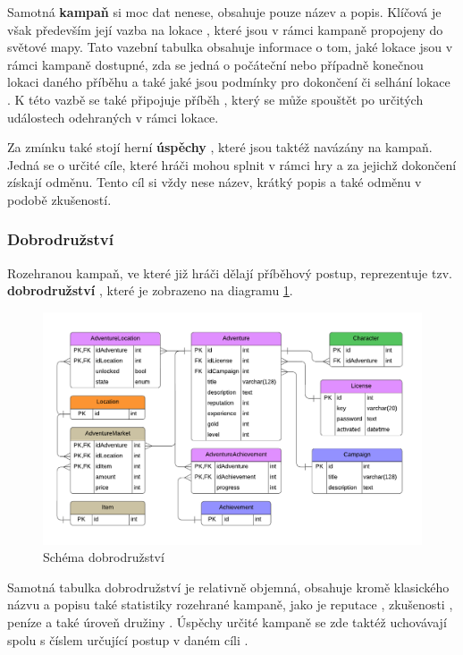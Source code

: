 Samotná \textbf{kampaň} si moc dat nenese, obsahuje pouze název a popis. Klíčová je však především její vazba na lokace , které jsou v rámci kampaně propojeny do světové mapy. Tato vazební tabulka obsahuje informace o tom, jaké lokace jsou v rámci kampaně dostupné, zda se jedná o počáteční  nebo případně konečnou  lokaci daného příběhu a také jaké jsou podmínky pro dokončení či selhání lokace . K této vazbě se také připojuje příběh , který se může spouštět po určitých událostech odehraných v rámci lokace.

Za zmínku také stojí herní \textbf{úspěchy} , které jsou taktéž navázány na kampaň. Jedná se o určité cíle, které hráči mohou splnit v rámci hry a za jejichž dokončení získají odměnu. Tento cíl si vždy nese název, krátký popis a také odměnu v podobě zkušeností.


\subsubsection*{Dobrodružství}
\label{subsubsec:schema_adventure}

Rozehranou kampaň, ve které již hráči dělají příběhový postup, reprezentuje tzv. \textbf{dobrodružství} , které je zobrazeno na diagramu \ref{diag:er_adventure}.

\begin{figure}[h]
    \centering
    \includegraphics[scale=0.8]{../../shared/diagrams/er_adventure.pdf}
    \caption{Schéma dobrodružství}
    \label{diag:er_adventure}
\end{figure}

Samotná tabulka dobrodružství je relativně objemná, obsahuje kromě klasického názvu a popisu také statistiky rozehrané kampaně, jako je reputace , zkušenosti , peníze  a také úroveň družiny . Úspěchy určité kampaně  se zde taktéž uchovávají spolu s číslem určující postup v daném cíli .

